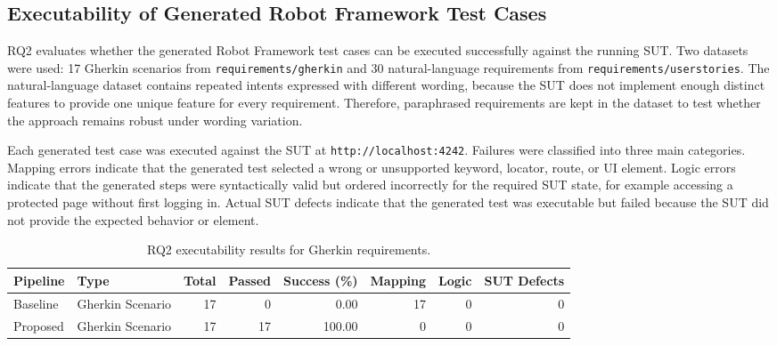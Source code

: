 
\subsection{Executability of Generated Robot Framework Test Cases}

RQ2 evaluates whether the generated Robot Framework test cases can be executed
successfully against the running SUT. Two datasets were used: 17 Gherkin
scenarios from \texttt{requirements/gherkin} and 30 natural-language
requirements from \texttt{requirements/userstories}. The natural-language
dataset contains repeated intents expressed with different wording, because the
SUT does not implement enough distinct features to provide one unique feature
for every requirement. Therefore, paraphrased requirements are kept in the
dataset to test whether the approach remains robust under wording variation.

Each generated test case was executed against the SUT at
\texttt{http://localhost:4242}. Failures were classified into three main
categories. Mapping errors indicate that the generated test selected a wrong or
unsupported keyword, locator, route, or UI element. Logic errors indicate that
the generated steps were syntactically valid but ordered incorrectly for the
required SUT state, for example accessing a protected page without first
logging in. Actual SUT defects indicate that the generated test was executable
but failed because the SUT did not provide the expected behavior or element.

\begin{table}[htbp]
\centering
\caption{RQ2 executability results for Gherkin requirements.}
\label{tab:rq2_gherkin_executability}
\begin{tabular}{llrrrrrr}
\toprule
Pipeline & Type & Total & Passed & Success (\%) & Mapping & Logic & SUT Defects \\
\midrule
Baseline & Gherkin Scenario & 17 & 0 & 0.00 & 17 & 0 & 0 \\
Proposed & Gherkin Scenario & 17 & 17 & 100.00 & 0 & 0 & 0 \\
\bottomrule
\end{tabular}
\end{table}

